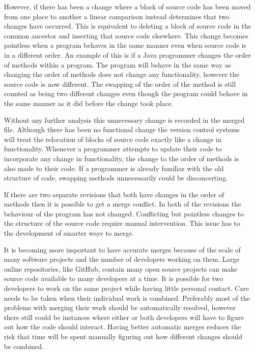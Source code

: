 
However, if there has been a change where a block of source code has been moved from one place to another a linear comparison instead determines that two changes have occurred.  This is equivalent to deleting a block of source code in the common ancestor and inserting that source code elsewhere. This change becomes pointless when a program behaves in the same manner even when source code is in a different order.  An example of this is if a Java programmer changes the order of methods within a program.  The program will behave in the same way as changing the order of methods does not change any functionality, however the source code is now different. The swapping of the order of the method is still counted as being two different changes even though the program could behave in the same manner as it did before the change took place.

Without any further analysis this unnecessary change is recorded in the merged file.  Although there has been no functional change the version control systems will treat the relocation of blocks of source code exactly like a change in functionality.  Whenever a programmer attempts to update their code to incorporate any change in functionality, the change to the order of methods is also made to their code.  If a programmer is already familiar with the old structure of code, swapping methods unnecessarily could be disconcerting.

If there are two separate revisions that both have changes in the order of methods then it is possible to get a merge conflict. In both of the revisions the behaviour of the program has not changed. Conflicting but pointless changes to the structure of the source code require manual intervention. This issue has to the development of smarter ways to merge.

It is becoming more important to have accurate merges because of the scale of many software projects and the number of developers working on them.  Large online repositories, like GitHub, contain many open source projects can make source code available to many developers at a time.  It is possible for two developers to work on the same project while having little personal contact. Care needs to be taken when their individual work is combined.  Preferably most of the problems with merging their work should be automatically resolved, however there still could be instances where either or both developers will have to figure out how the code should interact. Having better automatic merges reduces the risk that time will be spent manually figuring out how different changes should be combined.

